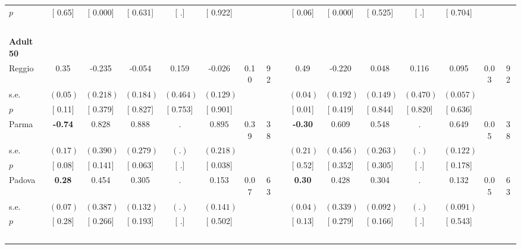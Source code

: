 \begin{longtable}{L{8em} c c c c c c c p{1em} c c c c c c c}
\quad \quad \quad \quad $ p$ & [     0.65] & [    0.000] & [    0.631] & [        .] & [    0.922] & & & & [     0.06] & [    0.000] & [    0.525] & [        .] & [    0.704] & &  \\[1em]
~\\[1em]
\quad \quad \textbf{Adult 50} & & & & & & & & & & & & & & & \\* 
\quad \quad \quad Reggio& 0.35 &    -0.235 &    -0.054 &     0.159 &    -0.026 &      0.10 &        92 & & 0.49 &    -0.220 &     0.048 &     0.116 &     0.095 &      0.03 &        92  \\*
\quad \quad \quad \quad s.e.& $ (     0.05)$ & $ (    0.218)$ & $ (    0.184)$ & $ (    0.464)$ & $ (    0.129)$ & & & & $ (     0.04)$ & $ (    0.192)$ & $ (    0.149)$ & $ (    0.470)$ & $ (    0.057)$ & &  \\*
\quad \quad \quad \quad $ p$ & [     0.11] & [    0.379] & [    0.827] & [    0.753] & [    0.901] & & & & [     0.01] & [    0.419] & [    0.844] & [    0.820] & [    0.636] & &  \\[1em]
\quad \quad \quad Parma& \textbf{    -0.74} &     0.828 & $ \mathbf{    0.888}$ &         . & $ \mathbf{    0.895}$ &      0.39 &        38 & & \textbf{    -0.30} &     0.609 &     0.548 &         . &     0.649 &      0.05 &        38  \\*
\quad \quad \quad \quad s.e.& $ (     0.17)$ & $ (    0.390)$ & $ (    0.279)$ & $ (        .)$ & $ (    0.218)$ & & & & $ (     0.21)$ & $ (    0.456)$ & $ (    0.263)$ & $ (        .)$ & $ (    0.122)$ & &  \\*
\quad \quad \quad \quad $ p$ & [     0.08] & [    0.141] & [    0.063] & [        .] & [    0.038] & & & & [     0.52] & [    0.352] & [    0.305] & [        .] & [    0.178] & &  \\[1em]
\quad \quad \quad Padova& \textbf{     0.28} &     0.454 &     0.305 &         . &     0.153 &      0.07 &        63 & & \textbf{     0.30} &     0.428 &     0.304 &         . &     0.132 &      0.05 &        63  \\*
\quad \quad \quad \quad s.e.& $ (     0.07)$ & $ (    0.387)$ & $ (    0.132)$ & $ (        .)$ & $ (    0.141)$ & & & & $ (     0.04)$ & $ (    0.339)$ & $ (    0.092)$ & $ (        .)$ & $ (    0.091)$ & &  \\*
\quad \quad \quad \quad $ p$ & [     0.28] & [    0.266] & [    0.193] & [        .] & [    0.502] & & & & [     0.13] & [    0.279] & [    0.166] & [        .] & [    0.543] & &  \\[1em]
~\\[1em]

\end{longtable}
